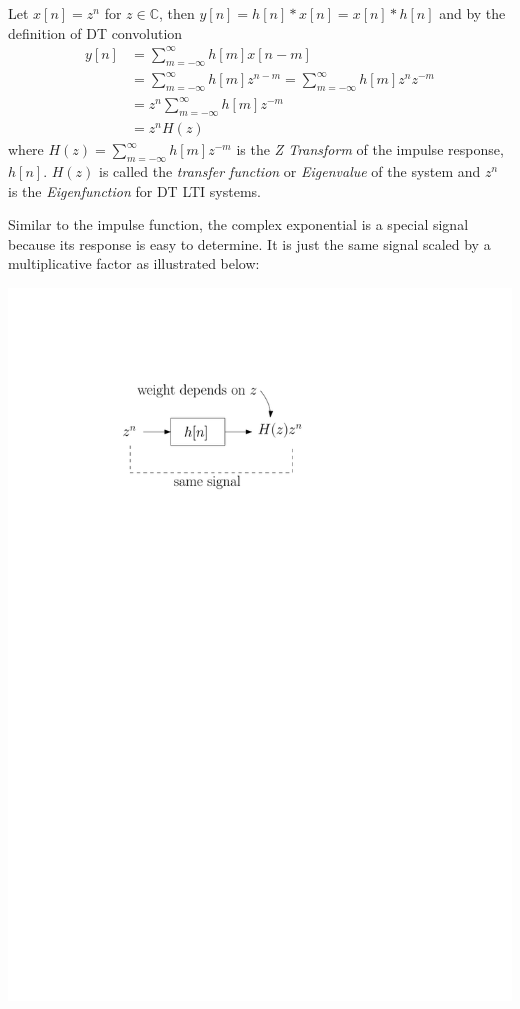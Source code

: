 Let $x[n] = z^n$ for $z\in \mathbb{C}$, then $y[n] = h[n] * x[n] = x[n] * h[n]$ and by the definition of DT convolution
\begin{align*}
  y[n] & = \sum\limits_{m = -\infty}^{\infty}h[m]x[n-m]\\
  &= \sum\limits_{m = -\infty}^{\infty}h[m]z^{n-m} = \sum\limits_{m = -\infty}^{\infty}h[m]z^{n}z^{-m}\\
  &= z^{n} \sum\limits_{m = -\infty}^{\infty}h[m]z^{-m}\\
  &= z^{n}H(z)
\end{align*}
where $H(z) = \sum\limits_{m = -\infty}^{\infty}h[m]z^{-m}$ is the \emph{Z Transform} of the impulse response, $h[n]$. $H(z)$ is called the \emph{transfer function} or \emph{Eigenvalue} of the system and $z^{n}$ is the \emph{Eigenfunction} for DT LTI systems.

Similar to the impulse function, the complex exponential is a special signal because its response is easy to determine. It is just the same signal scaled by a multiplicative factor as illustrated below:

\begin{center}
  \includegraphics[scale=0.6]{graphics/lti-dt-complex-exp.pdf}
\end{center}

